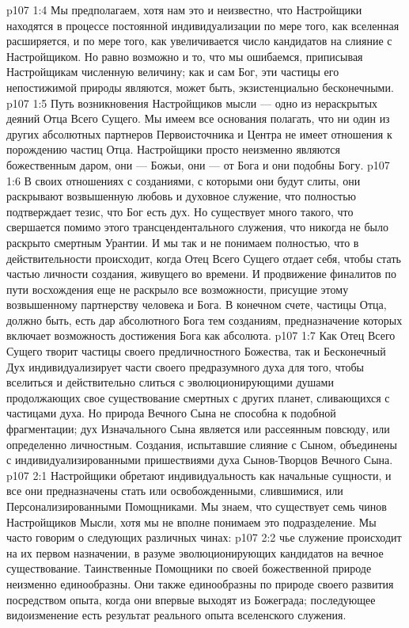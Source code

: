 \vs p107 1:4 Мы предполагаем, хотя нам это и неизвестно, что Настройщики находятся в процессе постоянной индивидуализации по мере того, как вселенная расширяется, и по мере того, как увеличивается число кандидатов на слияние с Настройщиком. Но равно возможно и то, что мы ошибаемся, приписывая Настройщикам численную величину; как и сам Бог, эти частицы его непостижимой природы являются, может быть, экзистенциально бесконечными.
\vs p107 1:5 Путь возникновения Настройщиков мысли --- одно из нераскрытых деяний Отца Всего Сущего. Мы имеем все основания полагать, что ни один из других абсолютных партнеров Первоисточника и Центра не имеет отношения к порождению частиц Отца. Настройщики просто неизменно являются божественным даром, они --- Божьи, они --- от Бога и они подобны Богу.
\vs p107 1:6 В своих отношениях с созданиями, с которыми они будут слиты, они раскрывают возвышенную любовь и духовное служение, что полностью подтверждает тезис, что Бог есть дух. Но существует много такого, что свершается помимо этого трансцендентального служения, что никогда не было раскрыто смертным Урантии. И мы так и не понимаем полностью, что в действительности происходит, когда Отец Всего Сущего отдает себя, чтобы стать частью личности создания, живущего во времени. И продвижение финалитов по пути восхождения еще не раскрыло все возможности, присущие этому возвышенному партнерству человека и Бога. В конечном счете, частицы Отца, должно быть, есть дар абсолютного Бога тем созданиям, предназначение которых включает возможность достижения Бога как абсолюта.
\vs p107 1:7 \pc Как Отец Всего Сущего творит частицы своего предличностного Божества, так и Бесконечный Дух индивидуализирует части своего предразумного духа для того, чтобы вселиться и действительно слиться с эволюционирующими душами продолжающих свое существование смертных с других планет, сливающихся с частицами духа. Но природа Вечного Сына не способна к подобной фрагментации; дух Изначального Сына является или рассеянным повсюду, или определенно личностным. Создания, испытавшие слияние с Сыном, объединены с индивидуализированными пришествиями духа Сынов\hyp{}Творцов Вечного Сына.
\vs p107 2:1 Настройщики обретают индивидуальность как начальные сущности, и все они предназначены стать или освобожденными, слившимися, или Персонализированными Помощниками. Мы знаем, что существует семь чинов Настройщиков Мысли, хотя мы не вполне понимаем это подразделение. Мы часто говорим о следующих различных чинах:
\vs p107 2:2 \pc {}\bibnobreakspace {} чье служение происходит на их первом назначении, в разуме эволюционирующих кандидатов на вечное существование. Таинственные Помощники по своей божественной природе неизменно единообразны. Они также единообразны по природе своего развития посредством опыта, когда они впервые выходят из Божеграда; последующее видоизменение есть результат реального опыта вселенского служения.
